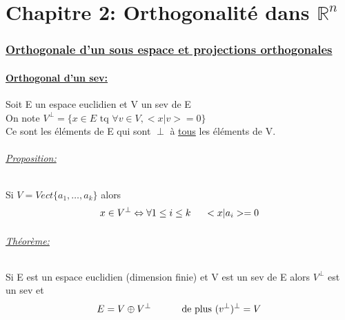 \documentclass{article}
\author{Frederic Becerril}
\newcommand\tab[1][1cm]{\hspace*{#1}}
\begin{document}
\part*{Chapitre 2: Orthogonalité dans $\mathbb{R}^n$}

\section{\underline{Orthogonale d'un sous espace et projections orthogonales}}

\subsection{\underline{Orthogonal d'un sev:}}

Soit E un espace euclidien et V un sev de E \\
On note $V^\perp = \{x \in E \mbox{ tq } \forall v \in V, <x|v> = 0\}$ \\
Ce sont les éléments de E qui sont $\perp$ à \underline{tous} les éléments de V.

\paragraph{\underline{Proposition:}} Si $V = Vect\{a_1, \dots, a_k\}$ alors
$$x \in V^\perp \Leftrightarrow \forall 1 \leq i \leq k \tab[0.5cm] <x|a_i> = 0$$

\paragraph{\underline{Théorème:}} Si E est un espace euclidien (dimension finie) et V est un sev de E alors $V^\perp$ est un sev et
$$E = V \oplus V^\perp \tab \mbox{ de plus } (v^\perp)^\perp = V$$ 
\end{document}
